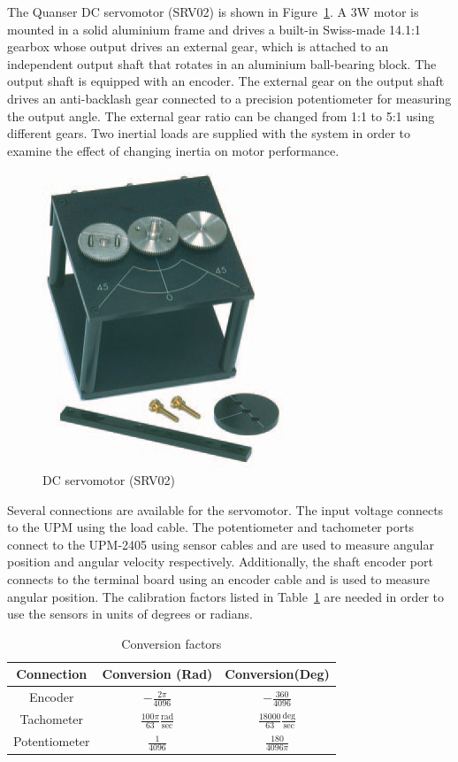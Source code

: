 The Quanser DC servomotor (SRV02) is shown in Figure~\ref{fig:motor}\@.  A 3W
motor is mounted in a solid aluminium frame and drives a built-in Swiss-made
14.1:1 gearbox whose output drives an external gear, which is attached to an
independent output shaft that rotates in an aluminium ball-bearing block.
The output shaft is equipped with an encoder.  The external gear on the
output shaft drives an anti-backlash gear connected to a precision
potentiometer for measuring the output angle.  The external gear ratio can be
changed from 1:1 to 5:1 using different gears.  Two inertial loads are
supplied with the system in order to examine the effect of changing inertia
on motor performance.
\begin{figure}[htbp]
\centering
\includegraphics[width=0.6\hsize]{pix/motor-eps-converted-to.pdf}
\caption{DC servomotor (SRV02)}\label{fig:motor}
\end{figure}%
Several connections are available for the servomotor. The input voltage
connects to the UPM using the load cable.  The potentiometer and tachometer
ports connect to the UPM-2405 using sensor cables and are used to measure
angular position and angular velocity respectively.  Additionally, the shaft
encoder port connects to the terminal board using an encoder cable and is
used to measure angular position.  The calibration factors listed in
Table~\ref{tab:conversionFactors} are needed in order to use the sensors in
units of degrees or radians.

\begin{table}[htbp]
\centering
\begin{tabular}{|c|c|c|}\hline
Connection&Conversion (Rad)&Conversion(Deg)\\\hline
Encoder&$-\frac{2\pi}{4096}$&$-\frac{360}{4096}$\\
Tachometer&$\frac{100\pi}{63} \frac{\text{rad}}{\text{sec}}$& $\frac{18000}{63} \frac{\text{deg}}{\text{sec}}$\\
Potentiometer&$\frac{1}{4096}$&$\frac{180}{4096\pi}$\\\hline
\end{tabular}
\caption{Conversion factors}\label{tab:conversionFactors}
\end{table}

